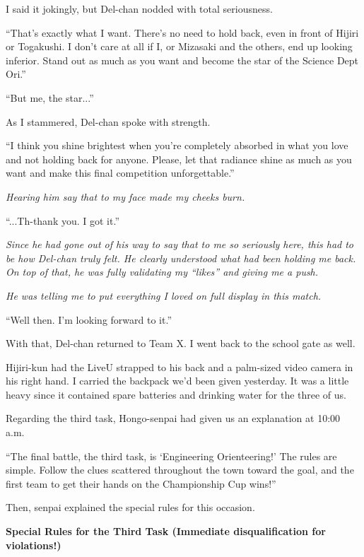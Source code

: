 \documentclass[
    a4paper,
    12pt,
    twoside,
    openany,
    UTF8,
    fontset=windows
]{ctexbook}
\begin{document}
I said it jokingly, but Del-chan nodded with total seriousness.

``That's exactly what I want. There's no need to hold back, even in front of Hijiri or Togakushi. I don't care at all if I, or Mizasaki and the others, end up looking inferior. Stand out as much as you want and become the star of the Science Dept Ori.''

``But me, the star...''

As I stammered, Del-chan spoke with strength.

``I think you shine brightest when you're completely absorbed in what you love and not holding back for anyone. Please, let that radiance shine as much as you want and make this final competition unforgettable.''

\textit{Hearing him say that to my face made my cheeks burn.}

``...Th-thank you. I got it.''

\textit{Since he had gone out of his way to say that to me so seriously here, this had to be how Del-chan truly felt. He clearly understood what had been holding me back. On top of that, he was fully validating my ``likes'' and giving me a push.}

\textit{He was telling me to put everything I loved on full display in this match.}

``Well then. I'm looking forward to it.''

With that, Del-chan returned to Team X. I went back to the school gate as well.

Hijiri-kun had the LiveU strapped to his back and a palm-sized video camera in his right hand. I carried the backpack we'd been given yesterday. It was a little heavy since it contained spare batteries and drinking water for the three of us.

Regarding the third task, Hongo-senpai had given us an explanation at 10:00 a.m.

``The final battle, the third task, is `Engineering Orienteering!' The rules are simple. Follow the clues scattered throughout the town toward the goal, and the first team to get their hands on the Championship Cup wins!''

Then, senpai explained the special rules for this occasion.

\begin{center}
\textbf{Special Rules for the Third Task (Immediate disqualification for violations!)}
\end{center}
\end{document}
